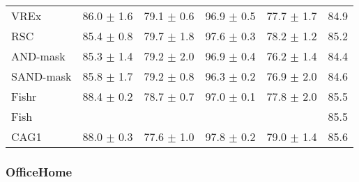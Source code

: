 \documentclass{article}
\begin{document}
\begin{center}
{\begin{tabular}{lccccc}
VREx                 & 86.0 $\pm$ 1.6       & 79.1 $\pm$ 0.6       & 96.9 $\pm$ 0.5       & 77.7 $\pm$ 1.7       & 84.9                 \\
RSC                  & 85.4 $\pm$ 0.8       & 79.7 $\pm$ 1.8       & 97.6 $\pm$ 0.3       & 78.2 $\pm$ 1.2       & 85.2                 \\
AND-mask             & 85.3 $\pm$ 1.4       & 79.2 $\pm$ 2.0       & 96.9 $\pm$ 0.4       & 76.2 $\pm$ 1.4       & 84.4                 \\
SAND-mask            & 85.8 $\pm$ 1.7       & 79.2 $\pm$ 0.8       & 96.3 $\pm$ 0.2       & 76.9 $\pm$ 2.0       & 84.6                 \\
Fishr                & 88.4 $\pm$ 0.2       & 78.7 $\pm$ 0.7       & 97.0 $\pm$ 0.1       & 77.8 $\pm$ 2.0       & 85.5                 \\
Fish                 &                      &                      &                      &                      & 85.5                 \\
\midrule
CAG1                 & 88.0 $\pm$ 0.3       & 77.6 $\pm$ 1.0       & 97.8 $\pm$ 0.2       & 79.0 $\pm$ 1.4       & 85.6                 \\
\bottomrule
\end{tabular}}
\end{center}

 

\subsubsection{OfficeHome}
\end{document}
